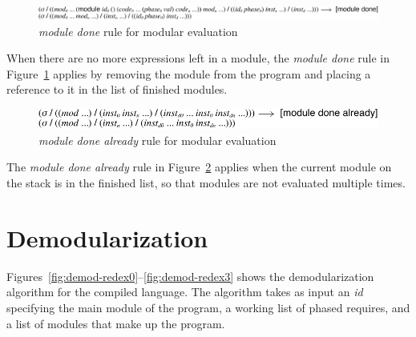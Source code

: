 \begin{figure}[!h]
  \includegraphics[width=\textwidth]{figures/eval-reduction5}
\caption{\emph{module done} rule for modular evaluation}
\label{fig:eval-reduction5}
\end{figure}
When there are no more expressions left in a module, the \emph{module done} rule in Figure~\ref{fig:eval-reduction5} applies by removing the module from the program and placing a reference to it in the list of finished modules.

\begin{figure}[!h]
  \includegraphics{figures/eval-reduction6}
\caption{\emph{module done already} rule for modular evaluation}
\label{fig:eval-reduction6}
\end{figure}
The \emph{module done already} rule in Figure~\ref{fig:eval-reduction6} applies when the current module on the stack is in the finished list, so that modules are not evaluated multiple times. 

\section{Demodularization}

Figures~\ref{fig:demod-redex0}--\ref{fig:demod-redex3} shows the demodularization algorithm for the compiled language.
The algorithm takes as input an \emph{id} specifying the main module of the program, a working list of phased requires, and a list of modules that make up the program.


